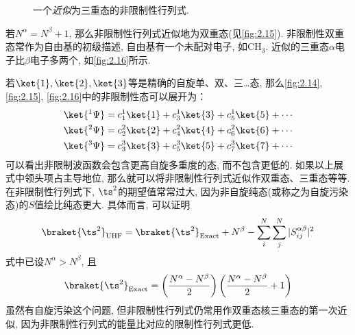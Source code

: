 \begin{figure}
\begin{minipage}{.48\textwidth}
        \caption{一个\emph{近似}为三重态的非限制性行列式. }
        \label{fig:2.16}
        \end{minipage}
\end{figure}  

若$N^\alpha=N^\beta+1$, 
那么非限制性行列式近似地为双重态(见\autoref{fig:2.15}). 
非限制性双重态常作为自由基的初级描述, 
自由基有一个未配对电子, 
如$\mathrm{CH}_3$. 
近似的三重态$\alpha$电子比$\beta$电子多两个, 
如\autoref{fig:2.16}所示.


若$\ket{1},\ket{2},\ket{3}$等是精确的自旋单、双、三…态, 
那么\autoref{fig:2.14},
\autoref{fig:2.15}, 
\autoref{fig:2.16}中的非限制性态可以展开为：
\begin{subequations}
	\begin{align}
	\ket{^1\Psi} = c_1^1\ket{1} + c_3^1\ket{3} + c_5^1\ket{5} + \cdots\\
	\ket{^2\Psi} = c_2^2\ket{2} + c_4^2\ket{4} + c_6^2\ket{6} + \cdots\\
	\ket{^3\Psi} = c_3^3\ket{3} + c_5^3\ket{5} + c_7^3\ket{7} + \cdots  
	\end{align}
\end{subequations}
可以看出非限制波函数会包含更高自旋多重度的态, 
而不包含更低的. 
如果以上展式中领头项占主导地位,
那么就可以将非限制性行列式近似作双重态、三重态等等. 
在非限制性行列式下, 
$\ts^2$的期望值常常过大, 
因为非自旋纯态(或称之为自旋污染态)的$S$值绘比纯态更大. 
具体而言, 
可以证明
\begin{align}\label{eq:2.271}
\braket{\ts^2}_\mathrm{UHF} = \braket{\ts^2}_\mathrm{Exact} + N^\beta - \sum_i^N\sum_j^N|S_{ij}^{\alpha\beta}|^2
\end{align}
式中已设$N^\alpha > N^\beta$, 
且
\begin{align}
	\braket{\ts^2}_\mathrm{Exact} = \left( \frac{N^\alpha - N^\beta}{2} \right) \left( \frac{N^\alpha - N^\beta}{2} + 1\right)
\end{align}
虽然有自旋污染这个问题, 
但非限制性行列式仍常用作双重态核三重态的第一次近似, 
因为非限制性行列式的能量比对应的限制性行列式更低.

